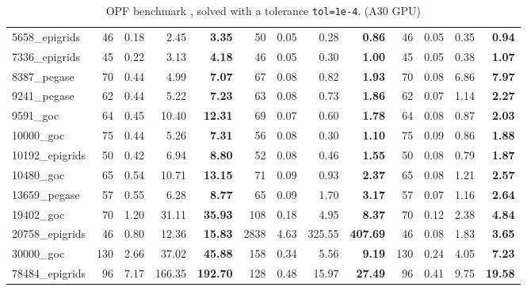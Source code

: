 \begin{table}[!ht]
{\begin{tabular}{|l|rrr >{\bfseries}r|rrr >{\bfseries}r|rrr >{\bfseries}r|}
5658\_epigrids & 46 & 0.18 & 2.45 & 3.35 & 50 & 0.05 & 0.28 & 0.86 & 46 & 0.05 & 0.35 & 0.94 \\
7336\_epigrids & 45 & 0.22 & 3.13 & 4.18 & 46 & 0.05 & 0.30 & 1.00 & 45 & 0.05 & 0.38 & 1.07 \\
8387\_pegase & 70 & 0.44 & 4.99 & 7.07 & 67 & 0.08 & 0.82 & 1.93 & 70 & 0.08 & 6.86 & 7.97 \\
9241\_pegase & 62 & 0.44 & 5.22 & 7.23 & 63 & 0.08 & 0.73 & 1.86 & 62 & 0.07 & 1.14 & 2.27 \\
			\hline
9591\_goc & 64 & 0.45 & 10.40 & 12.31 & 69 & 0.07 & 0.60 & 1.78 & 64 & 0.08 & 0.87 & 2.03 \\
10000\_goc & 75 & 0.44 & 5.26 & 7.31 & 56 & 0.08 & 0.30 & 1.10 & 75 & 0.09 & 0.86 & 1.88 \\
10192\_epigrids & 50 & 0.42 & 6.94 & 8.80 & 52 & 0.08 & 0.46 & 1.55 & 50 & 0.08 & 0.79 & 1.87 \\
10480\_goc & 65 & 0.54 & 10.71 & 13.15 & 71 & 0.09 & 0.93 & 2.37 & 65 & 0.08 & 1.21 & 2.57 \\
13659\_pegase & 57 & 0.55 & 6.28 & 8.77 & 65 & 0.09 & 1.70 & 3.17 & 57 & 0.07 & 1.16 & 2.64 \\
			\hline
19402\_goc & 70 & 1.20 & 31.11 & 35.93 & 108 & 0.18 & 4.95 & 8.37 & 70 & 0.12 & 2.38 & 4.84 \\
20758\_epigrids & 46 & 0.80 & 12.36 & 15.83 & 2838 & 4.63 & 325.55 & 407.69 & 46 & 0.08 & 1.83 & 3.65 \\
30000\_goc & 130 & 2.66 & 37.02 & 45.88 & 158 & 0.34 & 5.56 & 9.19 & 130 & 0.24 & 4.05 & 7.23 \\
78484\_epigrids & 96 & 7.17 & 166.35 & 192.70 & 128 & 0.48 & 15.97 & 27.49 & 96 & 0.41 & 9.75 & 19.58 \\
			\hline
		\end{tabular}
  }
  \caption{OPF benchmark \label{tab:opf:benchmark}, solved with a tolerance {\tt tol=1e-4}. (A30 GPU)}
\end{table}

